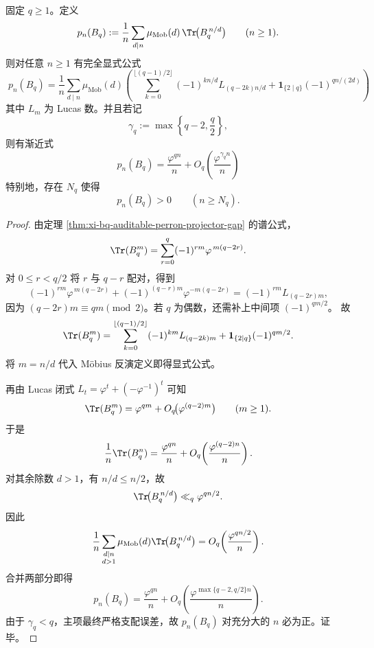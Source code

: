 \begin{theorem}\label{thm:xi-bq-auditable-primitive-orbit-lucas-mobius}
固定 \(q\ge 1\)。定义
\[
p_n(B_q):=\frac1n\sum_{d\mid n}\mu_{\mathrm{Mob}}(d)\,
\Tr\!\bigl(B_q^{\,n/d}\bigr)\qquad(n\ge 1).
\]
则对任意 \(n\ge 1\) 有完全显式公式
\[
\boxed{\;
p_n(B_q)
=
\frac1n\sum_{d\mid n}\mu_{\mathrm{Mob}}(d)
\left(
\sum_{k=0}^{\lfloor (q-1)/2\rfloor}
(-1)^{k n/d}L_{(q-2k)n/d}
+\mathbf 1_{\{2\mid q\}}(-1)^{qn/(2d)}
\right)\;}
\]
其中 \(L_m\) 为 Lucas 数。并且若记
\[
\gamma_q:=\max\!\left\{q-2,\frac q2\right\},
\]
则有渐近式
\[
\boxed{\;
p_n(B_q)=\frac{\varphi^{qn}}{n}
+O_q\!\left(\frac{\varphi^{\gamma_q n}}{n}\right)\;}
\]
特别地，存在 \(N_q\) 使得
\[
\boxed{\;
p_n(B_q)>0\qquad(n\ge N_q).\;}
\]
\end{theorem}
\begin{proof}
由定理 \ref{thm:xi-bq-auditable-perron-projector-gap} 的谱公式，
\[
\Tr(B_q^m)=\sum_{r=0}^{q}(-1)^{rm}\varphi^{\,m(q-2r)}.
\]
对 \(0\le r<q/2\) 将 \(r\) 与 \(q-r\) 配对，得到
\[
(-1)^{rm}\varphi^{\,m(q-2r)}
+(-1)^{(q-r)m}\varphi^{-m(q-2r)}
=
(-1)^{rm}L_{(q-2r)m},
\]
因为 \((q-2r)m\equiv qm\pmod 2\)。若 \(q\) 为偶数，还需补上中间项
\(
(-1)^{qm/2}
\)。
故
\[
\Tr(B_q^m)
=
\sum_{k=0}^{\lfloor (q-1)/2\rfloor}(-1)^{km}L_{(q-2k)m}
+\mathbf 1_{\{2\mid q\}}(-1)^{qm/2}.
\]
将 \(m=n/d\) 代入 Möbius 反演定义即得显式公式。

再由 Lucas 闭式
\(
L_t=\varphi^t+(-\varphi^{-1})^t
\)
可知
\[
\Tr(B_q^m)=\varphi^{qm}+O_q\!\bigl(\varphi^{(q-2)m}\bigr)
\qquad(m\ge 1).
\]
于是
\[
\frac1n\Tr(B_q^n)
=
\frac{\varphi^{qn}}{n}
+O_q\!\left(\frac{\varphi^{(q-2)n}}{n}\right).
\]
对其余除数 \(d>1\)，有 \(n/d\le n/2\)，故
\[
\Tr\!\bigl(B_q^{\,n/d}\bigr)\ll_q \varphi^{q n/2}.
\]
因此
\[
\frac1n\sum_{\substack{d\mid n\\ d>1}}
\mu_{\mathrm{Mob}}(d)\Tr\!\bigl(B_q^{\,n/d}\bigr)
=
O_q\!\left(\frac{\varphi^{qn/2}}{n}\right).
\]
合并两部分即得
\[
p_n(B_q)=\frac{\varphi^{qn}}{n}
+O_q\!\left(\frac{\varphi^{\max\{q-2,q/2\}n}}{n}\right).
\]
由于 \(\gamma_q<q\)，主项最终严格支配误差，故 \(p_n(B_q)\) 对充分大的 \(n\) 必为正。证毕。
\end{proof}


